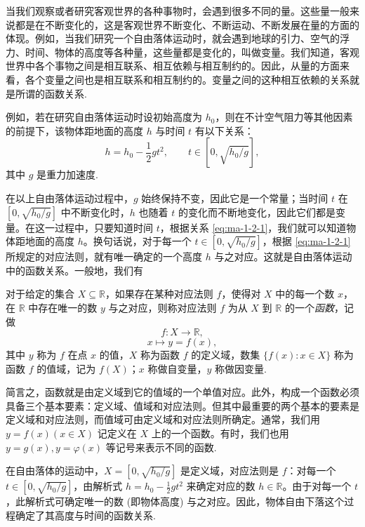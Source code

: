 当我们观察或者研究客观世界的各种事物时，会遇到很多不同的量。这些量一般来说都是在不断变化的，这是客观世界不断变化、不断运动、不断发展在量的方面的体现。例如，当我们研究一个自由落体运动时，就会遇到地球的引力、空气的浮力、时间、物体的高度等各种量，这些量都是变化的，叫做变量。我们知道，客观世界中各个事物之间是相互联系、相互依赖与相互制约的。因此，从量的方面来看，各个变量之间也是相互联系和相互制约的。变量之间的这种相互依赖的关系就是所谓的函数关系.

例如，若在研究自由落体运动时设初始高度为 $h_0$，则在不计空气阻力等其他因素的前提下，该物体距地面的高度 $h$ 与时间 $t$ 有以下关系：
\begin{equation}
  h=h_0-\frac12gt^2,\qquad t\in[0,\sqrt{h_0/g}],
  \label{eq:ma-1-2-1}
\end{equation}
其中 $g$ 是重力加速度.

在以上自由落体运动过程中，$g$ 始终保持不变，因此它是一个常量；当时间 $t$ 在 $[0,\sqrt{h_0/g}]$ 中不断变化时，$h$ 也随着 $t$ 的变化而不断地变化，因此它们都是变量。在这一过程中，只要知道时间 $t$，根据关系 \eqref{eq:ma-1-2-1}，我们就可以知道物体距地面的高度 $h$。换句话说，对于每一个 $t\in[0,\sqrt{h_0/g}]$，根据 \eqref{eq:ma-1-2-1} 所规定的对应法则，就有唯一确定的一个高度 $h$ 与之对应。这就是自由落体运动中的函数关系。一般地，我们有

\begin{definition}\label{definition:ma-1-2-1}
对于给定的集合 $X\subseteq\mathbb{R}$，如果存在某种对应法则 $f$，使得对 $X$ 中的每一个数 $x$，在 $\mathbb{R}$ 中存在唯一的数 $y$ 与之对应，则称对应法则 $f$ 为从 $X$ 到 $\mathbb{R}$ 的一个\emph{函数}，记做
\[
  f:X\to\mathbb{R},
\]
\[
  x\mapsto y=f(x),
\]
其中 $y$ 称为 $f$ 在点 $x$ 的值，$X$ 称为函数 $f$ 的定义域，数集 $\{f(x):x\in X\}$ 称为函数 $f$ 的值域，记为 $f(X)$；$x$ 称做自变量，$y$ 称做因变量.
\end{definition}

简言之，函数就是由定义域到它的值域的一个单值对应。此外，构成一个函数必须具备三个基本要素：定义域、值域和对应法则。但其中最重要的两个基本的要素是定义域和对应法则，而值域可由定义域和对应法则所确定。通常，我们用 $y=f(x)(x\in X)$ 记定义在 $X$ 上的一个函数。有时，我们也用 $y=g(x),y=\varphi(x)$ 等记号来表示不同的函数.

在自由落体的运动中，$X=[0,\sqrt{h_0/g}]$ 是定义域，对应法则是 $f$：对每一个 $t\in[0,\sqrt{h_0/g}]$，由解析式 $h=h_0-\frac12gt^2$ 来确定对应的数 $h\in\mathbb{R}$。由于对每一个 $t$，此解析式可确定唯一的数 (即物体高度) 与之对应。因此，物体自由下落这个过程确定了其高度与时间的函数关系.

